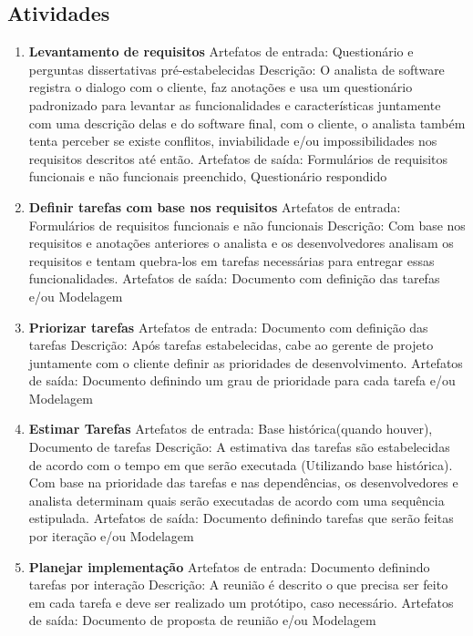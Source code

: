 \documentclass[	DIV=calc,%
							paper=a4,%
							fontsize=12pt,%
							onecolumn]{scrartcl}	 					%
\begin{document}
\subsection{Atividades}

\begin{enumerate}
	\item \textbf{Levantamento de requisitos}
	\subitem Artefatos de entrada: Questionário e perguntas dissertativas pré-estabelecidas
	\subitem Descrição: O analista de software registra o dialogo com o cliente, faz anotações e usa um questionário padronizado para levantar as funcionalidades e características juntamente com uma descrição delas e do software final, com o cliente, o analista também tenta perceber se existe conflitos, inviabilidade e/ou impossibilidades nos requisitos descritos até então.
	\subitem Artefatos de saída: Formulários de requisitos funcionais e não funcionais preenchido, Questionário respondido 
		
	\item \textbf{Definir tarefas com base nos requisitos}
	\subitem Artefatos de entrada: Formulários de requisitos funcionais e não funcionais
	\subitem Descrição: Com base nos requisitos e anotações anteriores o analista e os desenvolvedores analisam os requisitos e tentam quebra-los em tarefas necessárias para entregar essas funcionalidades.
	\subitem Artefatos de saída: Documento com definição das tarefas e/ou Modelagem

	\item \textbf{Priorizar tarefas} 
	\subitem Artefatos de entrada: Documento com definição das tarefas
	\subitem Descrição: 
	Após tarefas estabelecidas, cabe ao gerente de projeto juntamente com o cliente definir as prioridades de desenvolvimento.
	\subitem Artefatos de saída: Documento definindo um grau de prioridade para cada tarefa e/ou Modelagem
	
		\item \textbf{Estimar Tarefas}  
	\subitem Artefatos de entrada: Base histórica(quando houver), Documento de tarefas
	\subitem Descrição: A estimativa das tarefas são estabelecidas de acordo com o tempo em que serão executada (Utilizando base histórica). Com base na prioridade das tarefas e nas dependências, os desenvolvedores e analista determinam quais serão executadas de acordo com uma sequência estipulada. 
	\subitem Artefatos de saída: Documento definindo tarefas que serão feitas por iteração e/ou Modelagem
	
	
	\item \textbf{Planejar implementação}
	\subitem Artefatos de entrada: Documento definindo tarefas por interação
	\subitem Descrição: 
	A reunião é descrito o que precisa ser feito em cada tarefa e deve ser realizado um protótipo, caso necessário.
	\subitem Artefatos de saída: Documento de proposta de reunião e/ou Modelagem
	

\end{enumerate}
\end{document}
